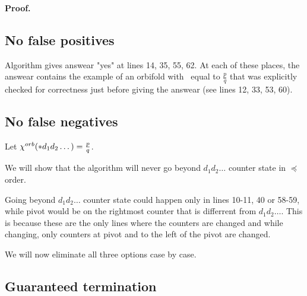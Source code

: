 \begin{lemma}

\end{lemma}
\textbf{Proof.} \\

\subsection{No false positives}
Algorithm gives answear "yes" at lines 14, 35, 55, 62. At each of these places, 
the answear contains the example of an orbifold with \Eoc\ equal to $\frac{p}{q}$ that was 
explicitly checked for correctness just before giving the answear (see lines 12, 33, 53, 60).     
\subsection{No false negatives}
Let ${\chi^{orb}(*d_1d_2\dots)} = \frac{p}{q}$. 

%

We will show that the algorithm will never 
go beyond $d_1d_2\dots$ counter state in $\preceq$ order. 

Going beyond $d_1d_2\dots$ counter state 
could happen only in lines 10-11, 40 or 58-59, while pivot would be 
on the rightmost counter that is differrent from $d_1d_2\dots$. 
This is because these are the only lines where the counters are changed and while changing, 
only counters 
at pivot and to the left of the pivot are changed. 

We will now eliminate all three options case by case. 
\subsubsection{}
\subsubsection{}
\subsubsection{}

\subsection{Guaranteed termination}



